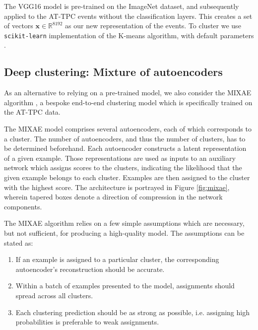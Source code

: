 \documentclass[review,number,sort&compress]{elsarticle}
\newcommand{\R}{\mathbb{R}}
\begin{document}

The VGG16 model is pre-trained on the ImageNet dataset, and subsequently applied to the AT-TPC events without the classification layers. This creates a set of vectors $\boldsymbol{x} \in \R^{8192}$ as our new representation of the events. To cluster we use \lstinline{scikit-learn} implementation of the K-means algorithm, with default parameters \cite{Pedregosa2011}.


\subsection{Deep clustering: Mixture of autoencoders}\label{sec:mixae}

As an alternative to relying on a pre-trained model, we also consider the MIXAE algorithm \cite{Zhang}, a bespoke end-to-end clustering model which is specifically trained on the AT-TPC data.

The MIXAE model comprises several autoencoders, each of which corresponds to a cluster. The number of autoencoders, and thus the number of clusters, has to be determined beforehand. Each autoencoder constructs a latent representation of a given example. Those representations are used as inputs to an auxiliary network which assigns scores to the clusters, indicating the likelihood that the given example belongs to each cluster. Examples are then assigned to the cluster with the highest score. The architecture is portrayed in Figure \ref{fig:mixae}, wherein tapered boxes denote a direction of compression in the network components. 


The MIXAE algorithm relies on a few simple assumptions which are necessary, but not sufficient, for producing a high-quality model. The assumptions can be stated as: 
\begin{enumerate}
	\item  If an example is assigned to a particular cluster, the corresponding autoencoder's reconstruction should be accurate. 
	\item Within a batch of examples presented to the model, assignments should spread across all clusters. 
	\item Each clustering prediction should be as strong as possible, i.e. assigning high probabilities is preferable to weak assignments.
\end{enumerate}
\end{document}

